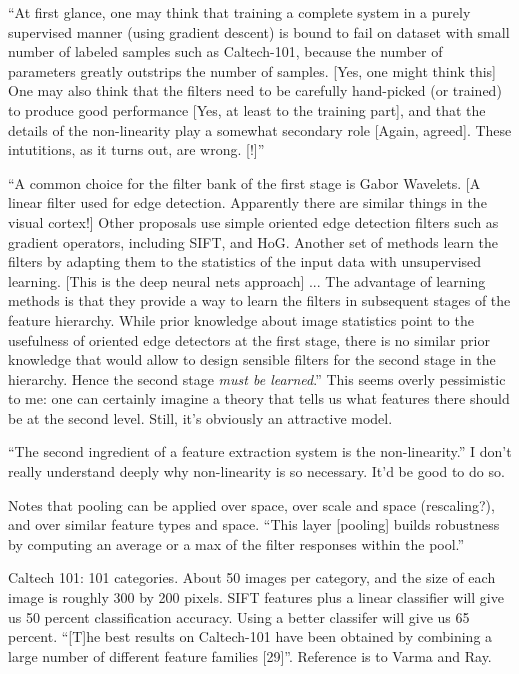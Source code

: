 \documentclass[12pt]{report}
\begin{document}
``At first glance, one may think that training a complete system in a
purely supervised manner (using gradient descent) is bound to fail on
dataset with small number of labeled samples such as Caltech-101,
because the number of parameters greatly outstrips the number of
samples.  [Yes, one might think this] One may also think that the
filters need to be carefully hand-picked (or trained) to produce good
performance [Yes, at least to the training part], and that the details
of the non-linearity play a somewhat secondary role [Again, agreed].
These intutitions, as it turns out, are wrong. [!]''

``A common choice for the filter bank of the first stage is Gabor
Wavelets.  [A linear filter used for edge detection.  Apparently there
are similar things in the visual cortex!] Other proposals use simple
oriented edge detection filters such as gradient operators, including
SIFT, and HoG.  Another set of methods learn the filters by adapting
them to the statistics of the input data with unsupervised
learning. [This is the deep neural nets approach] ... The advantage of
learning methods is that they provide a way to learn the filters in
subsequent stages of the feature hierarchy.  While prior knowledge
about image statistics point to the usefulness of oriented edge
detectors at the first stage, there is no similar prior knowledge that
would allow to design sensible filters for the second stage in the
hierarchy.  Hence the second stage \emph{must be learned}.''  This
seems overly pessimistic to me: one can certainly imagine a theory
that tells us what features there should be at the second level.
Still, it's obviously an attractive model.

``The second ingredient of a feature extraction system is the
non-linearity.''  I don't really understand deeply why non-linearity
is so necessary.  It'd be good to do so.

Notes that pooling can be applied over space, over scale and space
(rescaling?), and over similar feature types and space.  ``This layer
[pooling] builds robustness by computing an average or a max of the
filter responses within the pool.''

Caltech 101: 101 categories.  About 50 images per category, and the
size of each image is roughly 300 by 200 pixels.  SIFT features plus a
linear classifier will give us 50 percent classification accuracy.
Using a better classifer will give us 65 percent.  ``[T]he best
results on Caltech-101 have been obtained by combining a large number
of different feature families [29]''.  Reference is to Varma and Ray.
\end{document}
